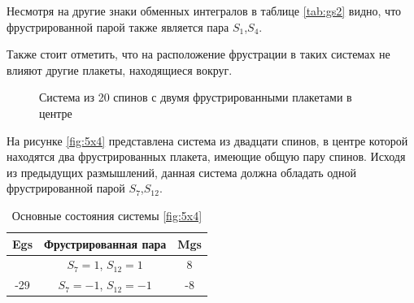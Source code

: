 \documentclass[utf8, babel, sor, jor, amsmath, amssymb, reprint]{elsarticle} %
\begin{document}
Несмотря на другие знаки обменных интегралов в таблице \eqref{tab:gs2} видно, что фрустрированной парой также является пара $S_1$,$S_4$.

Также стоит отметить, что на расположение фрустрации в таких системах  не влияют другие плакеты, находящиеся вокруг.

\begin{figure}[h]
	\centering
	\caption{Система из 20 спинов с двумя фрустрированными плакетами в центре}
	\label{fig:5x4}
\end{figure}

На рисунке \eqref{fig:5x4} представлена система из двадцати спинов, в центре которой находятся два фрустрированных плакета, имеющие общую пару спинов. Исходя из предыдущих размышлений, данная система должна обладать одной фрустрированной парой  $S_7$,$S_12$.

\begin{table}[h]
	\centering
	\begin{tabular}{|c|c|c|}
		\hline
		Egs   &   Фрустрированная пара & Mgs\\
		\hline
		 &  $S_7=1$, $S_{12}=1$ & 8 \\
	\cline{2-3}
		-29	\multirow{3}{*}{}
		  &   $S_7=-1$, $S_{12}=-1$ & -8 \\
		\hline
	\end{tabular}
	\caption{Основные состояния системы \eqref{fig:5x4}}
	\label{tab:gs3}
\end{table}
\end{document}
